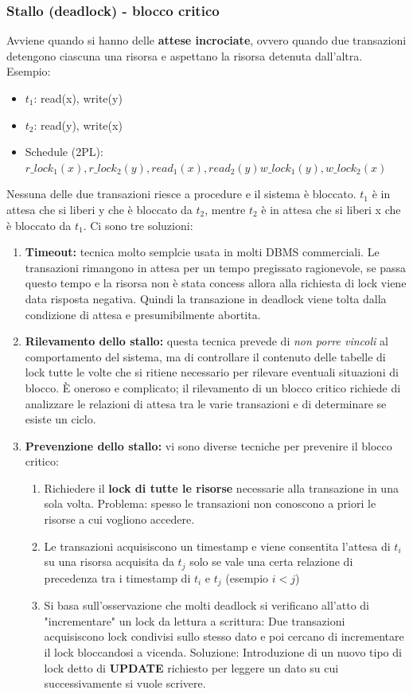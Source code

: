 \documentclass{article}
\newcounter{esempio}
\begin{document}
	\subsubsection{Stallo (deadlock) - blocco critico}
	Avviene quando si hanno delle \textbf{attese incrociate}, ovvero quando due transazioni detengono ciascuna una risorsa e aspettano la risorsa detenuta dall'altra.
	Esempio: \begin{itemize}
		\item $t_1$: read(x), write(y)
		\item $t_2$: read(y), write(x)
		\item Schedule (2PL):
		$r\_lock_1(x), r\_lock_2(y), read_1(x), read_2(y) w\_lock_1(y), w\_lock_2(x)$
	\end{itemize}
Nessuna delle due transazioni riesce a procedure e il sistema è bloccato. $t_1$ è in attesa che si liberi y che è bloccato da $t_2$, mentre $t_2$ è in attesa che si liberi x che è bloccato da $t_1$. Ci sono tre soluzioni:\begin{enumerate}
	\item \textbf{Timeout:} tecnica molto semplcie usata in molti DBMS commerciali. Le transazioni rimangono in attesa per un tempo pregissato ragionevole, se passa questo tempo e la risorsa non è stata concess allora alla richiesta di lock viene data risposta negativa. Quindi la transazione in deadlock viene tolta dalla condizione di attesa e presumibilmente abortita. 
	\item \textbf{Rilevamento dello stallo:} questa tecnica prevede di \textit{non porre vincoli} al comportamento del sistema, ma di controllare il contenuto delle tabelle di lock tutte le volte che si ritiene necessario per rilevare eventuali situazioni di blocco. È oneroso e complicato; il rilevamento di un blocco critico richiede di analizzare le relazioni di attesa tra le varie transazioni e di determinare se esiste un ciclo.
	\item \textbf{Prevenzione dello stallo:} vi sono diverse tecniche per prevenire il blocco critico: \begin{enumerate}
		\item Richiedere il \textbf{lock di tutte le risorse} necessarie alla transazione in una sola volta. Problema: spesso le transazioni non conoscono a priori le risorse a cui vogliono accedere.
		\item Le transazioni acquisiscono un timestamp e viene consentita l’attesa di $t_i$ su una risorsa acquisita da $t_j$ solo se vale una certa relazione di precedenza tra i timestamp di $t_i$ e $t_j$ (esempio $i<j$)
		\item Si basa sull’osservazione che molti deadlock si verificano all’atto di
		"incrementare" un lock da lettura a scrittura: Due transazioni acquisiscono lock condivisi sullo stesso dato e poi cercano di incrementare il lock bloccandosi a vicenda. Soluzione: Introduzione di un nuovo tipo di lock detto di \textbf{UPDATE} richiesto per leggere un dato su cui successivamente si vuole scrivere.
	
	\end{enumerate}
\end{enumerate}
\end{document}
